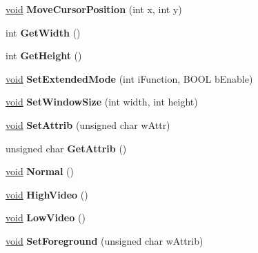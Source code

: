 \begin{DoxyCompactItemize}
\item 
\mbox{\label{class_t_console_adba8ec1dbe3f40b2b739737ab3167b42}} 
\hyperlink{interfacevoid}{void} {\bfseries Move\+Cursor\+Position} (int x, int y)
\item 
\mbox{\label{class_t_console_a0d32174682e4ab0586ee56a0fd29d526}} 
int {\bfseries Get\+Width} ()
\item 
\mbox{\label{class_t_console_abc9eaf46aa8d5d44f1116ba0cb37df43}} 
int {\bfseries Get\+Height} ()
\item 
\mbox{\label{class_t_console_a3ee5fc635f593fad8c6f7c033fea38c4}} 
\hyperlink{interfacevoid}{void} {\bfseries Set\+Extended\+Mode} (int i\+Function, B\+O\+OL b\+Enable)
\item 
\mbox{\label{class_t_console_a08301d604bea5b2698e5b94425c088f4}} 
\hyperlink{interfacevoid}{void} {\bfseries Set\+Window\+Size} (int width, int height)
\item 
\mbox{\label{class_t_console_adce68a72b543f27fa814965a3e711ba5}} 
\hyperlink{interfacevoid}{void} {\bfseries Set\+Attrib} (unsigned char w\+Attr)
\item 
\mbox{\label{class_t_console_aad1223215c09f0602fa3b58cc3a119f2}} 
unsigned char {\bfseries Get\+Attrib} ()
\item 
\mbox{\label{class_t_console_a4125591b629907e5dd23ceb20b248ea8}} 
\hyperlink{interfacevoid}{void} {\bfseries Normal} ()
\item 
\mbox{\label{class_t_console_a36b858b1cd32130fc8ae288a16af089f}} 
\hyperlink{interfacevoid}{void} {\bfseries High\+Video} ()
\item 
\mbox{\label{class_t_console_a4d6f59d50015c508c617524f77f8bae0}} 
\hyperlink{interfacevoid}{void} {\bfseries Low\+Video} ()
\item 
\mbox{\label{class_t_console_adc5bac32cacebf21e692d05e20196503}} 
\hyperlink{interfacevoid}{void} {\bfseries Set\+Foreground} (unsigned char w\+Attrib)

\end{DoxyCompactItemize}
